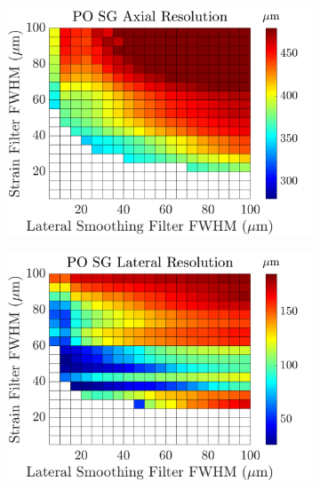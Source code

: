 \begin{figure}[h!]
\begin{subfigure}{0.49\textwidth}
		\includegraphics[width=\textwidth]{imageres_figs/posg_axial.png}
	\end{subfigure}
	\begin{subfigure}{0.49\textwidth}
		\centering
		\includegraphics[width=\textwidth]{imageres_figs/posg_lateral.png}
	\end{subfigure}
	\\
	\begin{subfigure}{0.49\textwidth}
		\centering

\end{subfigure}
\end{figure}
